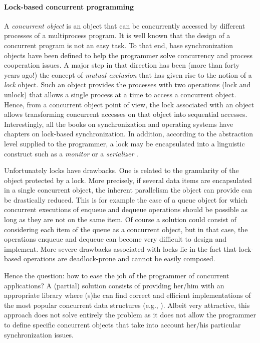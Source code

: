 \paragraph{Lock-based concurrent programming}
A   {\it concurrent  object} is  an   object that can be   concurrently  
accessed by different processes of a  multiprocess program. 
%
It is well known  that the design of a concurrent program is not an easy
task. To that end, base synchronization objects have been defined to help 
the programmer solve  concurrency and process cooperation  issues. 
A  major step in that direction has been 
(more than forty years  ago!) the concept of {\it mutual exclusion} \cite{D68}
that has given rise  to  the  notion of  a  {\it  lock} object.    Such an
object provides the processes with two operations (lock and unlock)
that  allows a single process at a time to access a concurrent object. 
Hence, from a  concurrent object point of view,   the  lock associated with
an object allows transforming  concurrent  accesses on  that object  
into sequential accesses.  Interestingly, all the books on synchronization 
and operating systems  have chapters on lock-based
synchronization. In addition, according to the abstraction level
supplied to the programmer,  a lock may be encapsulated into a linguistic 
construct such as a {\it monitor} \cite{H74} or a {\it serializer} \cite{HA79}.



Unfortunately locks have drawbacks. One is related to the  granularity
of the object protected by a lock. More precisely, if several data items 
are encapsulated  in a single  concurrent  object, the
inherent parallelism  the object can provide 
can be drastically reduced. This  is for example the case of a queue 
object for which concurrent executions of enqueue and dequeue operations 
should be possible as long as they are not on the same item.
Of  course  a   solution  could  consist of  considering  each item of the
queue as  a concurrent object, but in that case, the  operations  enqueue  
and  dequeue  can  become very   difficult  to  design and implement. 
More severe  drawbacks associated with locks lie in the fact that 
lock-based operations are deadlock-prone and cannot be easily composed. 

Hence  the question:  how to  ease  the  job of  the programmer  of
concurrent applications?
A (partial)  solution consists of providing her/him with an appropriate 
library where  (s)he  can  find  correct  and  efficient  implementations  of  
the most popular concurrent data structures (e.g., \cite{HS08,MS96}). 
Albeit very attractive, this approach does not solve entirely the problem  
as it does not allow the programmer to define  specific concurrent objects 
that take into account  her/his particular  synchronization issues. 


